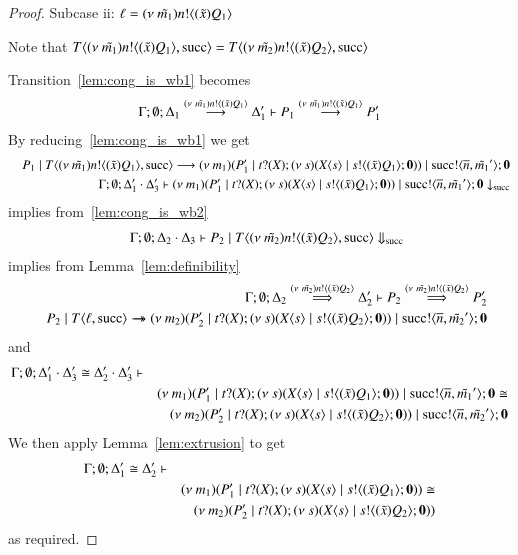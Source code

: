 \begin{proof}
	\noi Subcase ii: $\ell = (\nu\ \tilde{m_1}) n ! \langle (\tilde{x}) Q_1 \rangle$

	\noi Note that $T\langle (\nu\ \tilde{m_1}) n ! \langle (\tilde{x}) Q_1 \rangle, \textrm{succ} \rangle = T\langle (\nu\ \tilde{m_2}) n ! \langle (\tilde{x}) Q_2 \rangle, \textrm{succ} \rangle$

	\noi Transition~\ref{lem:cong_is_wb1} becomes
	\begin{eqnarray}
		\Gamma; \emptyset; \Delta_1 \stackrel{(\nu\ \tilde{m_1}) n ! \langle (\tilde{x}) Q_1 \rangle}{\longrightarrow} \Delta_1' \vdash P_1 \stackrel{(\nu\ \tilde{m_1}) n ! \langle (\tilde{x}) Q_1 \rangle}{\longrightarrow} P_1'
		\label{lem:cong_is_wb3}
	\end{eqnarray}
	\noi By reducing~\ref{lem:cong_is_wb1} we get
	\begin{eqnarray*}
		&&P_1 \;|\; T\langle (\nu\ \tilde{m_1}) n ! \langle (\tilde{x}) Q_1 \rangle, \textrm{succ} \rangle \longrightarrow (\nu\ m_1)(P_1' \;|\; t ? (X) ; (\nu\ s)(X\langle s \rangle \;|\; s ! \langle (\tilde{x}) Q_1 \rangle ; \mathbf{0})) \;|\; \textrm{succ} ! \langle \overline{n}, \tilde{m_1}' \rangle ; \mathbf{0} \\
		&&\Gamma; \emptyset; \Delta_1' \cdot \Delta_3' \vdash (\nu\ m_1)(P_1' \;|\; t ? (X) ; (\nu\ s)(X\langle s \rangle \;|\; s ! \langle (\tilde{x}) Q_1 \rangle ; \mathbf{0})) \;|\; \textrm{succ} ! \langle \overline{n}, \tilde{m_1}' \rangle ; \mathbf{0} \downarrow_{\textrm{succ}}
	\end{eqnarray*}
	\noi implies from~\ref{lem:cong_is_wb2}
	\begin{eqnarray*}
		&&\Gamma; \emptyset; \Delta_2 \cdot \Delta_3 \vdash P_2 \;|\; T\langle (\nu\ \tilde{m_2}) n ! \langle (\tilde{x}) Q_2 \rangle, \textrm{succ} \rangle \Downarrow_{\textrm{succ}}
	\end{eqnarray*}
	\noi implies from Lemma~\ref{lem:definibility}
	\begin{eqnarray}
		&&\Gamma; \emptyset; \Delta_2 \stackrel{(\nu\ \tilde{m_2}) n ! \langle (\tilde{x}) Q_2 \rangle}{\Longrightarrow} \Delta_2' \vdash P_2 \stackrel{(\nu\ \tilde{m_2}) n ! \langle (\tilde{x}) Q_2 \rangle}{\Longrightarrow} P_2'
		\label{lem:cong_is_wb4}\\
		&&P_2 \;|\; T \langle \ell, \textrm{succ} \rangle \rightarrow\!\!\!\!\!\rightarrow (\nu\ m_2)(P_2' \;|\; t ? (X) ; (\nu\ s)(X\langle s \rangle \;|\; s ! \langle (\tilde{x}) Q_2 \rangle ; \mathbf{0})) \;|\; \textrm{succ} ! \langle \overline{n}, \tilde{m_2}' \rangle ; \mathbf{0} \nonumber
	\end{eqnarray}
	\noi and
	\begin{eqnarray*}
		\Gamma; \emptyset; \Delta_1' \cdot \Delta_3' \cong \Delta_2' \cdot \Delta_3' \vdash\\
		&& (\nu\ m_1)(P_1' \;|\; t ? (X) ; (\nu\ s)(X\langle s \rangle \;|\; s ! \langle (\tilde{x}) Q_1 \rangle ; \mathbf{0})) \;|\; \textrm{succ} ! \langle \overline{n}, \tilde{m_1}' \rangle ; \mathbf{0} \cong\\
		&& (\nu\ m_2)(P_2' \;|\; t ? (X) ; (\nu\ s)(X\langle s \rangle \;|\; s ! \langle (\tilde{x}) Q_2 \rangle ; \mathbf{0})) \;|\; \textrm{succ} ! \langle \overline{n}, \tilde{m_2}' \rangle ; \mathbf{0}
	\end{eqnarray*}
	We then apply Lemma~\ref{lem:extrusion} to get
	\begin{eqnarray*}
		\Gamma; \emptyset; \Delta_1' \cong \Delta_2' \vdash\\
		&& (\nu\ m_1)(P_1' \;|\; t ? (X) ; (\nu\ s)(X\langle s \rangle \;|\; s ! \langle (\tilde{x}) Q_1 \rangle ; \mathbf{0})) \cong\\
		&& (\nu\ m_2)(P_2' \;|\; t ? (X) ; (\nu\ s)(X\langle s \rangle \;|\; s ! \langle (\tilde{x}) Q_2 \rangle ; \mathbf{0}))
	\end{eqnarray*}
	\noi as required.


\end{proof}
